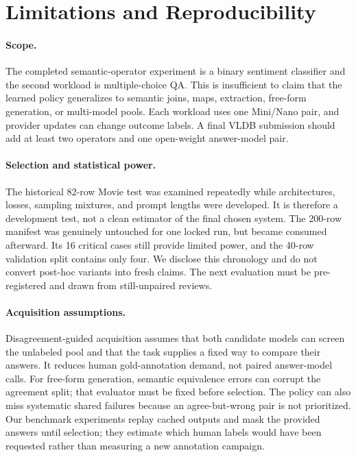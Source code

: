 \section{Limitations and Reproducibility}
\label{sec:limitations}

\paragraph{Scope.}
The completed semantic-operator experiment is a binary sentiment classifier and
the second workload is multiple-choice QA. This is insufficient to claim that
the learned policy generalizes to semantic joins, maps, extraction, free-form
generation, or multi-model pools. Each workload uses one Mini/Nano pair, and
provider updates can change outcome labels. A final VLDB submission should add
at least two operators and one open-weight answer-model pair.

\paragraph{Selection and statistical power.}
The historical 82-row Movie test was examined repeatedly while architectures,
losses, sampling mixtures, and prompt lengths were developed. It is therefore a
development test, not a clean estimator of the final chosen system. The
200-row manifest was genuinely untouched for one locked run, but became
consumed afterward. Its 16 critical cases still provide limited power, and the
40-row validation split contains only four. We disclose this chronology and do
not convert post-hoc variants into fresh claims. The next evaluation must be
pre-registered and drawn from still-unpaired reviews.

\paragraph{Acquisition assumptions.}
Disagreement-guided acquisition assumes that both candidate models can screen
the unlabeled pool and that the task supplies a fixed way to compare their
answers. It reduces human gold-annotation demand, not paired answer-model
calls. For free-form generation, semantic equivalence errors can corrupt the
agreement split; that evaluator must be fixed before selection. The policy can
also miss systematic shared failures because an agree-but-wrong pair is not
prioritized. Our benchmark experiments replay cached outputs and mask the
provided answers until selection; they estimate which human labels would have
been requested rather than measuring a new annotation campaign.

